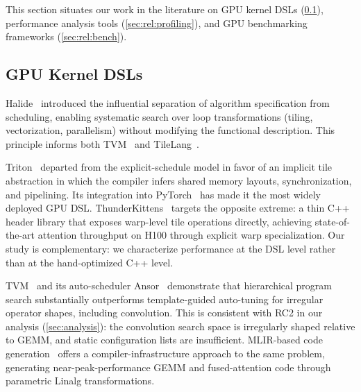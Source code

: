 This section situates our work in the literature on GPU kernel DSLs (\cref{sec:rel:dsls}),
performance analysis tools (\cref{sec:rel:profiling}),
and GPU benchmarking frameworks (\cref{sec:rel:bench}).

\subsection{GPU Kernel DSLs}
\label{sec:rel:dsls}

Halide~\cite{ragan-kelley2013halide} introduced the influential separation of
algorithm specification from scheduling,
enabling systematic search over loop transformations (tiling, vectorization, parallelism)
without modifying the functional description.
This principle informs both TVM~\cite{chen2018tvm} and TileLang~\cite{wang2025tilelang}.

Triton~\cite{tillet2019triton} departed from the explicit-schedule model
in favor of an implicit tile abstraction in which the compiler infers
shared memory layouts, synchronization, and pipelining.
Its integration into PyTorch~\cite{li2023torchcompile} has made it the
most widely deployed GPU DSL.
ThunderKittens~\cite{spector2024thunderkittens} targets the opposite extreme:
a thin C++ header library that exposes warp-level tile operations directly,
achieving state-of-the-art attention throughput on H100 through explicit warp specialization.
Our study is complementary: we characterize performance at the DSL level
rather than at the hand-optimized C++ level.

TVM~\cite{chen2018tvm} and its auto-scheduler Ansor~\cite{zheng2020ansor}
demonstrate that hierarchical program search
substantially outperforms template-guided auto-tuning for irregular operator shapes,
including convolution.
This is consistent with RC2 in our analysis (\cref{sec:analysis}):
the convolution search space is irregularly shaped relative to GEMM,
and static configuration lists are insufficient.
MLIR-based code generation~\cite{bik2022mlir,vasilache2022composable}
offers a compiler-infrastructure approach to the same problem,
generating near-peak-performance GEMM and fused-attention code
through parametric Linalg transformations.

